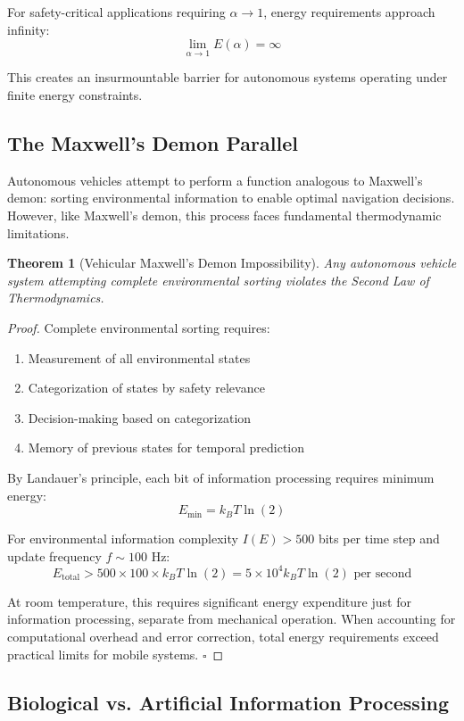 \documentclass[12pt,a4paper]{article}
\newtheorem{theorem}{Theorem}[section]
\begin{document}
For safety-critical applications requiring $\alpha \rightarrow 1$, energy requirements approach infinity:
$$\lim_{\alpha \rightarrow 1} E(\alpha) = \infty$$

This creates an insurmountable barrier for autonomous systems operating under finite energy constraints.

\subsection{The Maxwell's Demon Parallel}

Autonomous vehicles attempt to perform a function analogous to Maxwell's demon: sorting environmental information to enable optimal navigation decisions. However, like Maxwell's demon, this process faces fundamental thermodynamic limitations.

\begin{theorem}[Vehicular Maxwell's Demon Impossibility]
Any autonomous vehicle system attempting complete environmental sorting violates the Second Law of Thermodynamics.
\end{theorem}

\begin{proof}
Complete environmental sorting requires:
\begin{enumerate}
\item Measurement of all environmental states
\item Categorization of states by safety relevance
\item Decision-making based on categorization
\item Memory of previous states for temporal prediction
\end{enumerate}

By Landauer's principle, each bit of information processing requires minimum energy:
$$E_{\text{min}} = k_B T \ln(2)$$

For environmental information complexity $I(E) > 500$ bits per time step and update frequency $f \sim 100$ Hz:
$$E_{\text{total}} > 500 \times 100 \times k_B T \ln(2) = 5 \times 10^4 k_B T \ln(2) \text{ per second}$$

At room temperature, this requires significant energy expenditure just for information processing, separate from mechanical operation. When accounting for computational overhead and error correction, total energy requirements exceed practical limits for mobile systems. $\square$
\end{proof}

\subsection{Biological vs. Artificial Information Processing}
\end{document}
